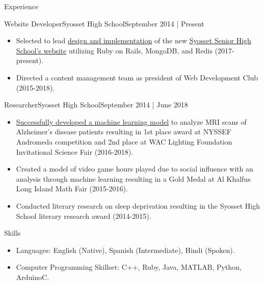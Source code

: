 \documentclass[]{mcdowellcv}
\begin{document}
    \begin{cvsection}{Experience}
        \begin{cvsubsection}{Website Developer}{Syosset High School}{September 2014 | Present}
            \begin{itemize}%
                \item Selected to lead \href{https://github.com/Syosset/syosset/}{design and implementation} of the new \href{https://syosseths.com/}{Syosset Senior High School’s website} utilizing Ruby on Rails, MongoDB, and Redis (2017-present).
                \item Directed a content management team as president of Web Development Club (2015-2018).
            \end{itemize}
        \end{cvsubsection}
        \begin{cvsubsection}{Researcher}{Syosset High School}{September 2014 | June 2018}
            \begin{itemize}%
                \item \href{https://drive.google.com/open?id=0BwjeQIrDl4kCRGJPZHNoZWRIVFE}{Successfully developed a machine learning model} to analyze MRI scans of Alzheimer’s disease patients resulting in 1st place award at NYSSEF Andromeda competition and 2nd place at WAC Lighting Foundation Invitational Science Fair (2016-2018).
                \item Created a model of video game hours played due to social influence with an analysis through machine learning resulting in a Gold Medal at Al Khalfus Long Island Math Fair (2015-2016).
                \item Conducted literary research on sleep deprivation resulting in the Syosset High School literary research award (2014-2015).
            \end{itemize}
        \end{cvsubsection}
    \end{cvsection}
    \begin{cvsection}{Skills}
        \begin{cvsubsection}{}{}{}
            \begin{itemize}
                \item Languages: English (Native), Spanish (Intermediate), Hindi (Spoken).
            \end{itemize}
            \begin{itemize}
                \item Computer Programming Skillset:  C++, Ruby, Java, MATLAB, Python, ArduinoC.
            \end{itemize}
        \end{cvsubsection}
    \end{cvsection}
\end{document}
